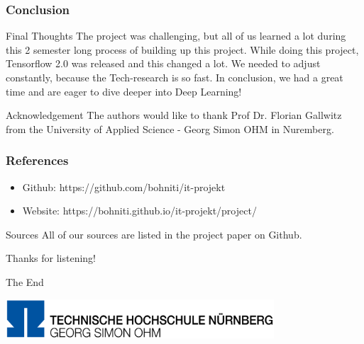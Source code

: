 \documentclass{beamer}
\begin{document}
\begin{frame}
\frametitle{Conclusion}
\begin{block}{Final Thoughts}
The project was challenging, but all of us learned a lot during this 2 semester long process of building up this project. While doing this project, Tensorflow 2.0 was released and this changed a lot. We needed to adjust constantly, because the Tech-research is so fast.
In conclusion, we had a great time and are eager to dive deeper into Deep Learning!
\end{block}
\begin{block}{Acknowledgement}
The authors would like to thank Prof Dr. Florian Gallwitz from the University of Applied Science - Georg Simon OHM in Nuremberg.
\end{block}
\end{frame}
%
%
\begin{frame}
\frametitle{References}
\begin{itemize}
\item Github: https://github.com/bohniti/it-projekt
\item Website: https://bohniti.github.io/it-projekt/project/
\end{itemize}
\begin{block}{Sources}
All of our sources are listed in the project paper on Github.
\end{block}
\begin{center}
Thanks for listening!
\end{center}
\end{frame}
%
%
\begin{frame}
\Huge{\centerline{The End}} 
\vspace{5mm}
\begin{center}
	\includegraphics[width=10cm]{photo/logo}
\end{center}
\end{frame}
\end{document}
